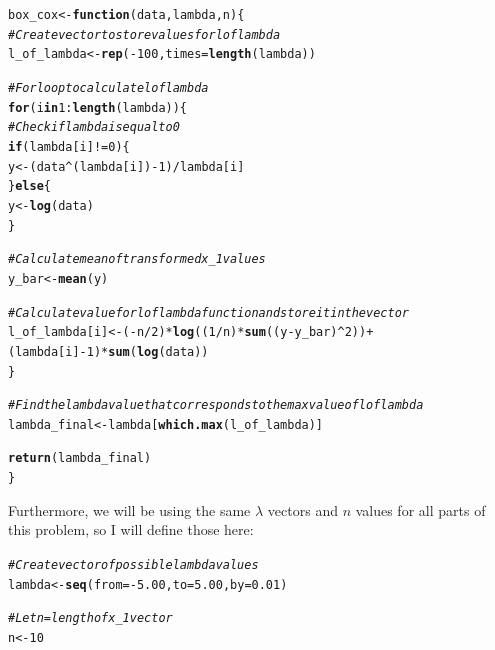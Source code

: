 \documentclass[12pt]{article}\usepackage[]{graphicx}\usepackage[]{color}
\makeatletter
\newcommand{\hlnum}[1]{\textcolor[rgb]{0.686,0.059,0.569}{#1}}%
\newcommand{\hlcom}[1]{\textcolor[rgb]{0.678,0.584,0.686}{\textit{#1}}}%
\newcommand{\hlopt}[1]{\textcolor[rgb]{0,0,0}{#1}}%
\newcommand{\hlstd}[1]{\textcolor[rgb]{0.345,0.345,0.345}{#1}}%
\newcommand{\hlkwa}[1]{\textcolor[rgb]{0.161,0.373,0.58}{\textbf{#1}}}%
\newcommand{\hlkwb}[1]{\textcolor[rgb]{0.69,0.353,0.396}{#1}}%
\newcommand{\hlkwc}[1]{\textcolor[rgb]{0.333,0.667,0.333}{#1}}%
\newcommand{\hlkwd}[1]{\textcolor[rgb]{0.737,0.353,0.396}{\textbf{#1}}}%
\newenvironment{kframe}{%
 \def\at@end@of@kframe{}%
 \ifinner\ifhmode%
  \def\at@end@of@kframe{\end{minipage}}%
  \begin{minipage}{\columnwidth}%
 \fi\fi%
 \def\FrameCommand##1{\hskip\@totalleftmargin \hskip-\fboxsep
 \colorbox{shadecolor}{##1}\hskip-\fboxsep
     \hskip-\linewidth \hskip-\@totalleftmargin \hskip\columnwidth}%
 \MakeFramed {\advance\hsize-\width
   \@totalleftmargin\z@ \linewidth\hsize
   \@setminipage}}%
 {\par\unskip\endMakeFramed%
 \at@end@of@kframe}
\newenvironment{knitrout}{}{} %
\makeatother
\begin{document}
\begin{knitrout}
\color{fgcolor}\begin{kframe}
\begin{alltt}
\hlstd{box_cox} \hlkwb{<-} \hlkwa{function}\hlstd{(}\hlkwc{data}\hlstd{,} \hlkwc{lambda}\hlstd{,} \hlkwc{n}\hlstd{)\{}
  \hlcom{#Create vector to store values for l of lambda}
  \hlstd{l_of_lambda} \hlkwb{<-} \hlkwd{rep}\hlstd{(}\hlopt{-}\hlnum{100}\hlstd{,} \hlkwc{times} \hlstd{=} \hlkwd{length}\hlstd{(lambda))}

  \hlcom{#For loop to calculate l of lambda}
  \hlkwa{for}\hlstd{(i} \hlkwa{in} \hlnum{1}\hlopt{:}\hlkwd{length}\hlstd{(lambda))\{}
    \hlcom{#Check if lambda is equal to 0}
    \hlkwa{if}\hlstd{(lambda[i]} \hlopt{!=} \hlnum{0}\hlstd{)\{}
      \hlstd{y} \hlkwb{<-} \hlstd{(data}\hlopt{^}\hlstd{(lambda[i])} \hlopt{-} \hlnum{1}\hlstd{)}\hlopt{/}\hlstd{lambda[i]}
    \hlstd{\}} \hlkwa{else}\hlstd{\{}
      \hlstd{y} \hlkwb{<-} \hlkwd{log}\hlstd{(data)}
    \hlstd{\}}

    \hlcom{#Calculate mean of transformed x_1 values}
    \hlstd{y_bar} \hlkwb{<-} \hlkwd{mean}\hlstd{(y)}

    \hlcom{#Calculate value for l of lambda function and store it in the vector}
    \hlstd{l_of_lambda[i]} \hlkwb{<-} \hlstd{(}\hlopt{-}\hlstd{n}\hlopt{/}\hlnum{2}\hlstd{)}\hlopt{*}\hlkwd{log}\hlstd{((}\hlnum{1}\hlopt{/}\hlstd{n)} \hlopt{*} \hlkwd{sum}\hlstd{((y} \hlopt{-} \hlstd{y_bar)}\hlopt{^}\hlnum{2}\hlstd{))} \hlopt{+}
      \hlstd{(lambda[i]} \hlopt{-} \hlnum{1}\hlstd{)} \hlopt{*} \hlkwd{sum}\hlstd{(}\hlkwd{log}\hlstd{(data))}
  \hlstd{\}}

  \hlcom{#Find the lambda value that corresponds to the max value of l of lambda}
  \hlstd{lambda_final} \hlkwb{<-} \hlstd{lambda[}\hlkwd{which.max}\hlstd{(l_of_lambda)]}

  \hlkwd{return}\hlstd{(lambda_final)}
\hlstd{\}}
\end{alltt}
\end{kframe}
\end{knitrout}

Furthermore, we will be using the same $\lambda$ vectors and $n$ values for all parts of this problem, so I will define those here:

\begin{knitrout}
\color{fgcolor}\begin{kframe}
\begin{alltt}
\hlcom{#Create vector of possible lambda values}
\hlstd{lambda} \hlkwb{<-} \hlkwd{seq}\hlstd{(}\hlkwc{from} \hlstd{=} \hlopt{-}\hlnum{5.00}\hlstd{,} \hlkwc{to} \hlstd{=} \hlnum{5.00}\hlstd{,} \hlkwc{by} \hlstd{=} \hlnum{0.01}\hlstd{)}

\hlcom{#Let n = length of x_1 vector}
\hlstd{n} \hlkwb{<-} \hlnum{10}
\end{alltt}
\end{kframe}
\end{knitrout}
\end{document}
